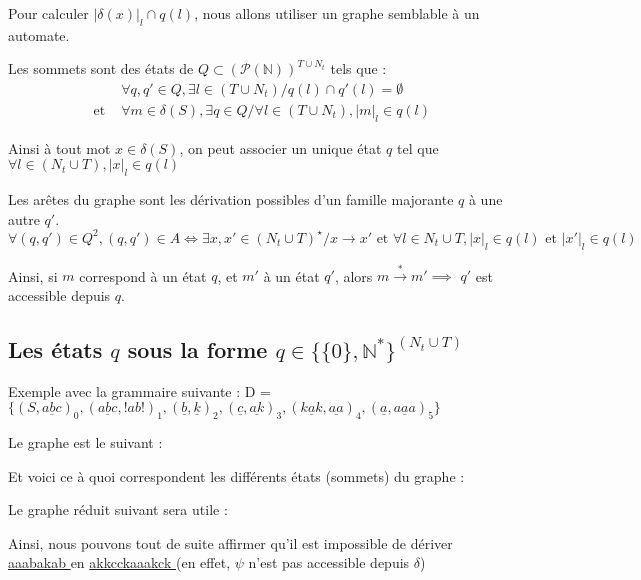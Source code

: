 \documentclass[a4paper,12pt]{article}
\newcommand{\norm}[1]{\lvert #1 \rvert}
\begin{document}
Pour calculer $\norm{\delta(x)}_l \cap q(l)$, nous allons utiliser un graphe semblable à un automate.

Les sommets sont des états de $Q \subset ({\mathcal{P}(\mathbb{N})})^{T\cup N_t}$ tels que :
\begin{align*}
    &\forall q,q' \in Q, \exists l \in (T \cup N_t) / q(l) \cap q'(l) = \emptyset\\
    \text{ et }&\forall m \in \delta(S), \exists q \in Q / \forall l \in (T \cup N_t), \norm{m}_l \in q(l)
\end{align*}

Ainsi à tout mot $x \in \delta(S)$, on peut associer un unique état $q$ tel que $\forall l \in (N_t \cup T), \norm{x}_l \in q(l)$

Les arêtes du graphe sont les dérivation possibles d'un famille majorante $q$ à une autre $q'$.
\begin{equation*}
    \forall (q,q') \in Q^2, (q,q') \in A \iff \exists x,x' \in (N_t \cup T )^\star / x \rightarrow x' \text{ et } \forall l \in N_t \cup T, \norm{x}_l \in q(l) \text{ et } \norm{x'}_l \in q(l)
\end{equation*}

Ainsi, si $m$ correspond à un état $q$, et $m'$ à un état $q'$, alors $m \overset{*}{\rightarrow} m' \implies$ $q'$ est accessible depuis $q$.

\subsection{Les états $q$ sous la forme $q \in \{\{0\},\mathbb{N}^*\}^{(N_t \cup T)}$}
Exemple avec la grammaire suivante :
D = $\{(S,\underline{ abc })_0,(\underline{ abc },!ab!)_1,(\underline{ b },\underline{ k })_2,(\underline{ c },\underline{ ak })_3,(\underline{ kak },\underline{ aa })_4,(\underline{ a },\underline{ aaa })_5\}$

Le graphe est le suivant :


Et voici ce à quoi correspondent les différents états (sommets) du graphe : 

 

Le graphe réduit suivant sera utile : 


Ainsi, nous pouvons tout de suite affirmer qu'il est impossible de dériver \underline{ aaabakab } en \underline{ akkcckaaakck } (en effet, $\psi$ n'est pas accessible depuis $\delta$)
\end{document}
